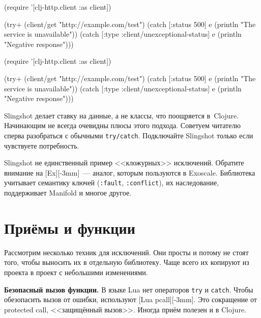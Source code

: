 \ifx\DEVICETYPE\MOBILE

\begin{english}
  \begin{clojure}
(require '[clj-http.client :as client])

(try+
 (client/get "http://example.com/test")
 (catch [:status 500] e
  (println "The service is unavailable"))
 (catch
  [:type :client/unexceptional-status] e
  (println "Negative response")))
  \end{clojure}
\end{english}

\else

\begin{english}
  \begin{clojure}
(require '[clj-http.client :as client])

(try+
 (client/get "http://example.com/test")
 (catch [:status 500] e
   (println "The service is unavailable"))
 (catch [:type :client/unexceptional-status] e
   (println "Negative response")))
  \end{clojure}
\end{english}

\fi

Slingshot делает ставку на данные, а не классы, что поощряется
в~Clojure. Начинающим не всегда очевидны плюсы этого подхода. Советуем читателю
сперва разобраться с обычными \verb|try/catch|. Подключайте Slingshot только
если чувствуете потребность.


Slingshot не единственный пример <<кложурных>> исключений. Обратите внимание на
[Ex][-3mm]~--- аналог, которым пользуются в
Exoscale. Библиотека учитывает семантику ключей (\verb|:fault|,
\verb|:conflict|), их наследование, поддерживает Manifold и многое
другое.

\section{Приёмы и функции}

Рассмотрим несколько техник для исключений. Они просты и потому не стоят того,
чтобы выносить их в отдельную библиотеку. Чаще всего их копируют из проекта в
проект с небольшими изменениями.


\label{pcall}

\textbf{Безопасный вызов функции.} В языке Lua нет операторов \verb|try| и
\verb|catch|. Чтобы обезопасить вызов от ошибки, используют
[Lua pcall][-3mm]. Это сокращение от
protected call, <<защищённый вызов>>. Иногда приём полезен и в Clojure.

